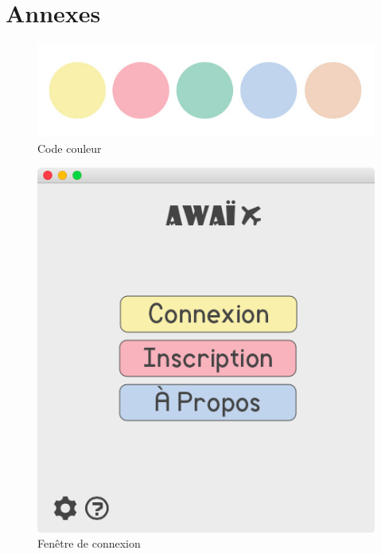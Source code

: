 \documentclass[11pt]{article}
\begin{document}
\newpage
\section*{Annexes}
\begin{figure}[hbtp]
        \centering \includegraphics[scale=0.6]{Modelisation/Couleurs/pastels.jpg}
        \caption{Code couleur}
	\label{fig:codecouleur}
\end{figure}
\begin{figure}[hbtp]
    \begin{minipage}[b]{0.4\linewidth}
        \centering \includegraphics[scale=0.43]{Modelisation/connexion.png}
        \caption{Fenêtre de connexion}
	\label{fig:connexion}
    \end{minipage}\hfill
    \begin{minipage}[b]{0.48\linewidth}

\end{minipage}
\end{figure}
\end{document}
